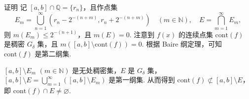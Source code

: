 \documentclass[../../main.tex]{subfiles}%
\begin{document}
\begin{remark}
证明 记 \( [a, b] \cap \mathbb{Q} = \{ r_n \} \)，且作点集
\[
E_m = \bigcup_{n = 1}^{\infty} \left( r_n - 2^{-(n + m)}, r_n + 2^{-(n + m)} \right) \quad (m \in \mathbb{N}), \quad E = \bigcap_{m = 1}^{\infty} E_m,
\]
则 \( m(E_m) \leqslant  2^{-(n + 1)} \)，且 \( m(E) = 0 \). 注意到 \( f(x) \) 的连续点集 \( \mathrm{cont}(f) \) 是稠密 \( G_{\delta} \) 集，且 \( m([a, b] \setminus \mathrm{cont}(f)) = 0 \). 根据 Baire 纲定理，可知 \( \mathrm{cont}(f) \) 是第二纲集.

\( [a, b] \setminus E_m \) \( (m \in \mathbb{N}) \) 是无处稠密集，\( E \) 是 \( G_{\delta} \) 集，\( [a, b] \setminus E = \bigcup_{m = 1}^{\infty} ([a, b] \setminus E_m) \) 是第一纲集. 从而得到 \( \mathrm{cont}(f) \not\subset [a, b] \setminus E \)，即 \( \mathrm{cont}(f) \cap E \neq \varnothing \).
\end{remark}
\end{document}
